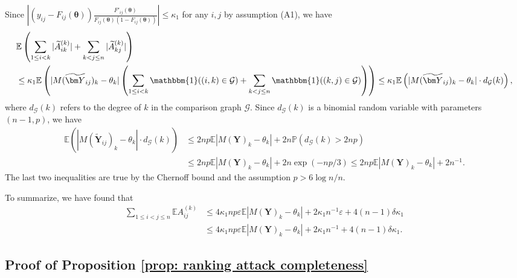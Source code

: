 \documentclass[letterpaper,12pt]{article}
\numberwithin{equation}{section}
\theoremstyle{plain}
\numberwithin{Theorem}{section}
\numberwithin{corollary}{section}
\numberwithin{proposition}{section}
\numberwithin{Lemma}{section}
{
	\theoremstyle{definition}
	\newtheorem{Definition}{Definition}
	\newtheorem{example}{Example}
	\numberwithin{example}{section}
	\newtheorem{fact}{Fact}
	\numberwithin{fact}{section}
	\newtheorem{remark}{Remark}
}
\newcommand{\Pro}{\mathbb{P}}
\newcommand{\1}{\mathbbm{1}}
\def\bth{{\boldsymbol{\theta}}}
\def\E{\mathbb{E}}
\begin{document}
	Since $\left|(y_{ij} - F_{ij}(\bth))\frac{F'_{ij}(\bth)}{F_{ij}(\bth)(1 - F_{ij}(\bth))}\right| \leq \kappa_1$ for any $i, j$ by assumption (A1), we have
	\begin{align*}
		&\E\left(\sum_{1 \leq i < k} |\widetilde A^{(k)}_{ik}| + \sum_{k < j \leq n } |\widetilde A^{(k)}_{kj}|\right) \\
		&\leq \kappa_1 \E\left(|M(\widetilde{\bm Y}_{ij})_k - \theta_k|\left(\sum_{1 \leq i < k} \1((i, k) \in \mathcal G) + \sum_{k < j \leq n } \1((k, j) \in \mathcal G)\right)\right) \leq \kappa_1 \E\left(|M(\widetilde{\bm Y}_{ij})_k - \theta_k| \cdot d_{\mathcal G}(k)\right),
	\end{align*}
	where $d_{\mathcal G}(k)$ refers to the degree of $k$ in the comparison graph $\mathcal G$. Since $d_{\mathcal G}(k)$ is a binomial random variable with parameters $(n-1, p)$, we have
	\begin{align*}
		\E\left(|M(\widetilde{\bm Y}_{ij})_k - \theta_k| \cdot d_{\mathcal G}(k)\right) &\leq 2np \E|M(\bm Y)_k - \theta_k| + 2n\Pro\left(d_{\mathcal G}(k) > 2np\right) \\
		&\leq 2np \E|M(\bm Y)_k - \theta_k| + 2n\exp\left(-np/3\right) \leq 2np \E|M(\bm Y)_k - \theta_k| + 2n^{-1}.
	\end{align*}
	The last two inequalities are true by the Chernoff bound and the assumption $p > 6\log n/n$.
	
	
	To summarize, we have found that
	\begin{align*}
		\sum_{1 \leq i < j \leq n} \E A^{(k)}_{ij} &\leq 4\kappa_1 np\varepsilon \E|M(\bm Y)_k - \theta_k| + 2\kappa_1 n^{-1}\varepsilon + 4(n-1)\delta\kappa_1 \\
		&\leq 4\kappa_1 np\varepsilon \E|M(\bm Y)_k - \theta_k| + 2\kappa_1 n^{-1} + 4(n-1)\delta\kappa_1.
	\end{align*}
 

\subsection{Proof of Proposition \ref{prop: ranking attack completeness}} 
\label{sec: proof of prop: ranking attack completeness}
\end{document}
